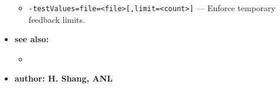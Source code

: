 \begin{itemize}
\begin{itemize}
        \item {\tt -testValues=file=<file>[,limit=<count>]} --- Enforce temporary feedback limits.
  \end{itemize}
\item {\bf see also:}
    \begin{itemize}
%
%
    \item {}
    \end{itemize}
%
%
\item {\bf author: H. Shang, ANL}
\end{itemize}
